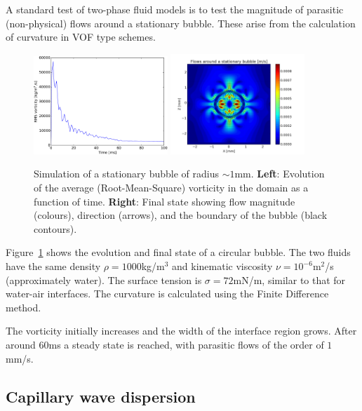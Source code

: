 \documentclass[12pt,a4paper]{article}
\begin{document}
A standard test of two-phase fluid models is to test the
magnitude of parasitic (non-physical) flows around a stationary bubble. These arise from the calculation of curvature in VOF type schemes.
\begin{figure}[h]
\centering
\includegraphics[width=0.45\textwidth]{bubble_vorticity.pdf}
\includegraphics[width=0.45\textwidth]{bubble_flows.png}
\caption{Simulation of a stationary bubble of radius $\sim 1$mm. {\bf Left}: Evolution of the average (Root-Mean-Square) vorticity in the domain as a function of time. {\bf Right}: Final state showing flow magnitude (colours), direction (arrows), and the boundary of the bubble (black contours).}
\label{fig:bubble}
\end{figure}
Figure~\ref{fig:bubble} shows the evolution and final state of
a circular bubble. The two fluids have the same density $\rho=1000$kg/m$^3$ and kinematic viscosity $\nu=10^{-6}$m$^2$/s (approximately water). The surface tension is $\sigma=72$mN/m, similar to that for water-air interfaces. The curvature is calculated using the Finite Difference method. 

The vorticity initially increases and the width of the interface region grows. After around $60$ms a steady state is reached, with parasitic flows of the order of $1$mm/s.

\subsection{Capillary wave dispersion}
\end{document}
